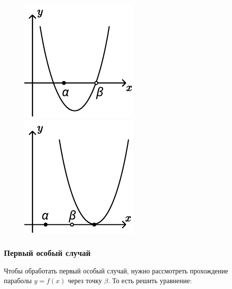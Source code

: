 \begin {figure}[h]
    \begin {minipage} [t] {0.5\linewidth}
        \centering
        \includegraphics [width=0.6\linewidth] {image/image_06.pdf}
    \end {minipage}
    \begin {minipage} [t] {0.5\linewidth}
        \centering
        \includegraphics [width=0.6\linewidth] {image/image_18.pdf}
    \end {minipage}
\end {figure}

\subsubsection {Первый особый случай}

Чтобы обработать первый особый случай, нужно рассмотреть прохождение параболы $y = f(x)$ через
точку $\beta$. То есть решить уравнение:

